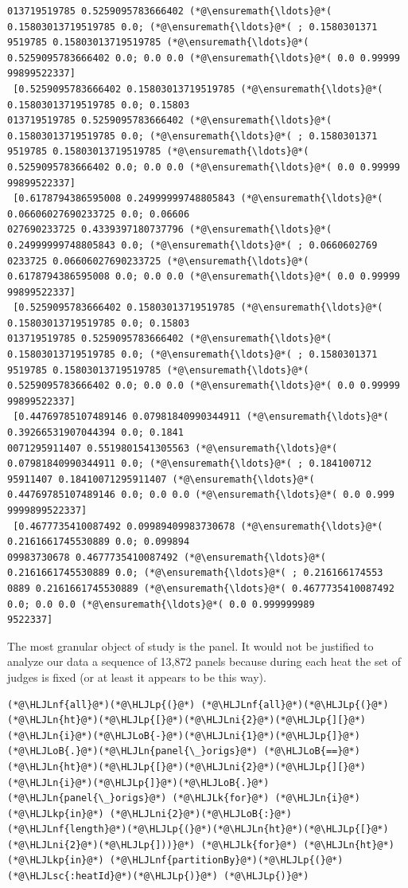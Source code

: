 \documentclass[12pt,a4paper]{article}
\newcommand{\HLJLk}[1]{\textcolor[RGB]{148,91,176}{\textbf{#1}}}
\newcommand{\HLJLkp}[1]{\textcolor[RGB]{148,91,176}{\textbf{#1}}}
\newcommand{\HLJLn}[1]{#1}
\newcommand{\HLJLnf}[1]{\textcolor[RGB]{66,102,213}{#1}}
\newcommand{\HLJLsc}[1]{\textcolor[RGB]{201,61,57}{#1}}
\newcommand{\HLJLni}[1]{\textcolor[RGB]{59,151,46}{#1}}
\newcommand{\HLJLoB}[1]{\textcolor[RGB]{102,102,102}{\textbf{#1}}}
\newcommand{\HLJLp}[1]{#1}
\begin{document}
\begin{lstlisting}
013719519785 0.5259095783666402 (*@\ensuremath{\ldots}@*( 0.15803013719519785 0.0; (*@\ensuremath{\ldots}@*( ; 0.1580301371
9519785 0.15803013719519785 (*@\ensuremath{\ldots}@*( 0.5259095783666402 0.0; 0.0 0.0 (*@\ensuremath{\ldots}@*( 0.0 0.99999
99899522337]
 [0.5259095783666402 0.15803013719519785 (*@\ensuremath{\ldots}@*( 0.15803013719519785 0.0; 0.15803
013719519785 0.5259095783666402 (*@\ensuremath{\ldots}@*( 0.15803013719519785 0.0; (*@\ensuremath{\ldots}@*( ; 0.1580301371
9519785 0.15803013719519785 (*@\ensuremath{\ldots}@*( 0.5259095783666402 0.0; 0.0 0.0 (*@\ensuremath{\ldots}@*( 0.0 0.99999
99899522337]
 [0.6178794386595008 0.24999999748805843 (*@\ensuremath{\ldots}@*( 0.06606027690233725 0.0; 0.06606
027690233725 0.4339397180737796 (*@\ensuremath{\ldots}@*( 0.24999999748805843 0.0; (*@\ensuremath{\ldots}@*( ; 0.0660602769
0233725 0.06606027690233725 (*@\ensuremath{\ldots}@*( 0.6178794386595008 0.0; 0.0 0.0 (*@\ensuremath{\ldots}@*( 0.0 0.99999
99899522337]
 [0.5259095783666402 0.15803013719519785 (*@\ensuremath{\ldots}@*( 0.15803013719519785 0.0; 0.15803
013719519785 0.5259095783666402 (*@\ensuremath{\ldots}@*( 0.15803013719519785 0.0; (*@\ensuremath{\ldots}@*( ; 0.1580301371
9519785 0.15803013719519785 (*@\ensuremath{\ldots}@*( 0.5259095783666402 0.0; 0.0 0.0 (*@\ensuremath{\ldots}@*( 0.0 0.99999
99899522337]
 [0.44769785107489146 0.07981840990344911 (*@\ensuremath{\ldots}@*( 0.39266531907044394 0.0; 0.1841
0071295911407 0.5519801541305563 (*@\ensuremath{\ldots}@*( 0.07981840990344911 0.0; (*@\ensuremath{\ldots}@*( ; 0.184100712
95911407 0.18410071295911407 (*@\ensuremath{\ldots}@*( 0.44769785107489146 0.0; 0.0 0.0 (*@\ensuremath{\ldots}@*( 0.0 0.999
9999899522337]
 [0.4677735410087492 0.09989409983730678 (*@\ensuremath{\ldots}@*( 0.2161661745530889 0.0; 0.099894
09983730678 0.4677735410087492 (*@\ensuremath{\ldots}@*( 0.2161661745530889 0.0; (*@\ensuremath{\ldots}@*( ; 0.216166174553
0889 0.2161661745530889 (*@\ensuremath{\ldots}@*( 0.4677735410087492 0.0; 0.0 0.0 (*@\ensuremath{\ldots}@*( 0.0 0.999999989
9522337]
\end{lstlisting}


The most granular object of study is the panel. It would not be justified to analyze our data a sequence of 13,872 panels because during each heat the set of judges is fixed (or at least it appears to be this way).


\begin{lstlisting}
(*@\HLJLnf{all}@*)(*@\HLJLp{(}@*) (*@\HLJLnf{all}@*)(*@\HLJLp{(}@*)(*@\HLJLn{ht}@*)(*@\HLJLp{[}@*)(*@\HLJLni{2}@*)(*@\HLJLp{][}@*)(*@\HLJLn{i}@*)(*@\HLJLoB{-}@*)(*@\HLJLni{1}@*)(*@\HLJLp{]}@*)(*@\HLJLoB{.}@*)(*@\HLJLn{panel{\_}origs}@*) (*@\HLJLoB{==}@*) (*@\HLJLn{ht}@*)(*@\HLJLp{[}@*)(*@\HLJLni{2}@*)(*@\HLJLp{][}@*)(*@\HLJLn{i}@*)(*@\HLJLp{]}@*)(*@\HLJLoB{.}@*)(*@\HLJLn{panel{\_}origs}@*) (*@\HLJLk{for}@*) (*@\HLJLn{i}@*) (*@\HLJLkp{in}@*) (*@\HLJLni{2}@*)(*@\HLJLoB{:}@*)(*@\HLJLnf{length}@*)(*@\HLJLp{(}@*)(*@\HLJLn{ht}@*)(*@\HLJLp{[}@*)(*@\HLJLni{2}@*)(*@\HLJLp{]))}@*) (*@\HLJLk{for}@*) (*@\HLJLn{ht}@*) (*@\HLJLkp{in}@*) (*@\HLJLnf{partitionBy}@*)(*@\HLJLp{(}@*)(*@\HLJLsc{:heatId}@*)(*@\HLJLp{)}@*) (*@\HLJLp{)}@*)
\end{lstlisting}
\end{document}
